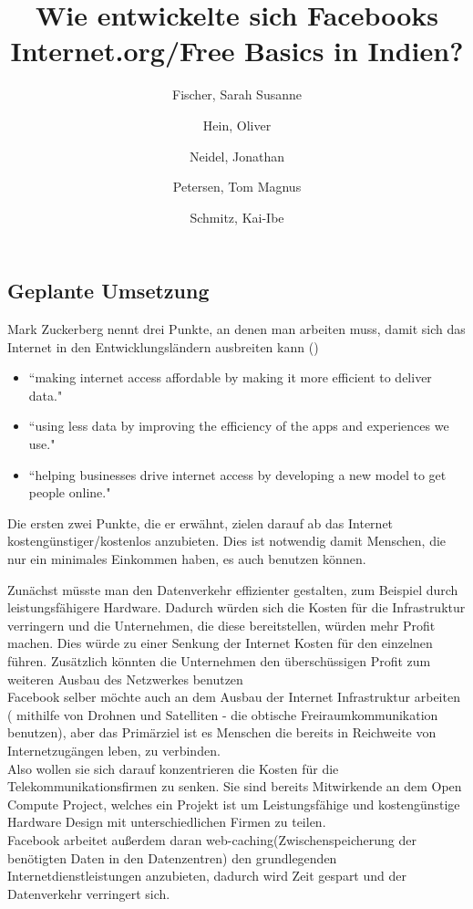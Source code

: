\documentclass{article}
\title{Wie entwickelte sich Facebooks Internet.org/Free Basics in Indien?}
\author{
  Fischer, Sarah Susanne\\
  \and
  Hein, Oliver\\
  \and
  Neidel, Jonathan\\
  \and
  Petersen, Tom Magnus\\
  \and
  Schmitz, Kai-Ibe\\
}
\begin{document}
\maketitle

\subsection{Geplante Umsetzung}
        
Mark Zuckerberg nennt drei Punkte, an denen man arbeiten muss, damit sich das Internet in den Entwicklungsländern ausbreiten kann
(\cite{HumanRight})    
\begin{itemize}
\item ``making internet access affordable by making it more efficient to deliver data."

\item ``using less data by improving the efficiency of the apps and experiences we use."

\item ``helping businesses drive internet access by developing a new model to get people online."  
\end{itemize}

Die ersten zwei Punkte, die er erwähnt, zielen darauf ab das Internet kostengünstiger/kostenlos anzubieten. 
Dies ist notwendig damit Menschen, die nur ein minimales Einkommen haben, es auch benutzen können.
\medskip

Zunächst müsste man den Datenverkehr effizienter gestalten, zum Beispiel durch leistungsfähigere Hardware.
Dadurch würden sich die Kosten für die Infrastruktur verringern und die Unternehmen, die diese bereitstellen, würden mehr Profit    
machen. Dies würde zu einer Senkung der Internet Kosten für den einzelnen führen.
Zusätzlich könnten die Unternehmen den überschüssigen Profit zum weiteren Ausbau des Netzwerkes benutzen\\

Facebook selber möchte auch an dem Ausbau der Internet Infrastruktur arbeiten ( mithilfe von Drohnen und Satelliten - die obtische    
Freiraumkommunikation benutzen), aber das Primärziel ist es Menschen die bereits in Reichweite von Internetzugängen leben, zu
verbinden.\\
Also wollen sie sich darauf konzentrieren die Kosten für die Telekommunikationsfirmen zu senken.
Sie sind bereits Mitwirkende an dem Open Compute Project, welches ein Projekt ist um Leistungsfähige und kostengünstige Hardware 
Design mit unterschiedlichen Firmen zu teilen. \\
Facebook arbeitet außerdem daran web-caching(Zwischenspeicherung der benötigten Daten in den Datenzentren) den grundlegenden 
Internetdienstleistungen anzubieten, dadurch wird Zeit gespart und der Datenverkehr verringert sich.\\
\end{document}

